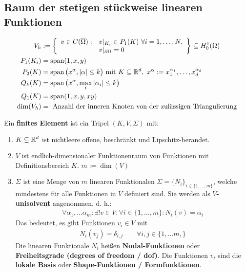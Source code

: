 \subsection*{Raum der stetigen stückweise linearen Funktionen}
\begin{align*}
	V_h&:=\left\lbrace
	\begin{array}{rl}
		v\in C(\overline{\Omega}) : &v|_{K_i}\in P_1(K)~\forall i=1,\ldots,N,\\
		&v|_{\partial\Omega}=0
	\end{array}\right\rbrace
	\subseteq H^1_0(\Omega)\\
	P_1(K_i)&=\operatorname{span}(1,x,y)\\
	P_2(K)&=\operatorname{span}\big( x^\alpha, |\alpha|\leq k\big)\text{ mit } K\subseteq\mathbb{R}^d,~ x^{\alpha}:=x_1^{\alpha_1},\ldots,x_d^{\alpha_d}\\
	Q_k(K)&=\operatorname{span}\big(x^\alpha,\max\limits_i |\alpha_i|\leq k\big)\\
	Q_1(K)&=\operatorname{span}(1,x,y,xy)\\
	\dim(V_h)&=\text{ Anzahl der inneren Knoten von der zulässigen Triangulierung}\\
\end{align*}

\begin{definition}\enter %
	Ein \textbf{finites Element} ist ein Tripel $(K,V,\Sigma)$ mit:
	\begin{enumerate}[label=(\roman*)]
		\item $K\subseteq\mathbb{R}^d$ ist nichtleere offene, beschränkt und Lipschitz-berandet.
		\item $V$ ist endlich-dimensionaler Funktionenraum von Funktionen mit Definitionsbereich $K$. $m:=\dim(V)$
		\item $\Sigma$ ist eine Menge von $m$ linearen Funktionalen $\Sigma=\lbrace N_i\rbrace_{i\in\lbrace1,\ldots,m\rbrace}$, welche mindestens für alle 	 Funktionen in $V$ definiert sind.
		Sie werden als \textbf{$V$-unisolvent} angenommen, d. h.:
		\begin{align*}
			\forall \alpha_1,\ldots\alpha_m:\exists! v\in V:\forall i\in\lbrace1,\ldots,m\rbrace:N_i(v)=\alpha_i
		\end{align*}
		Das bedeutet, es gibt Funktionen $v_i\in V$ mit
		\begin{align*}
			N_i(v_j)=\delta_{i,j}\qquad\forall i,j\in\lbrace1,\ldots m,\rbrace
		\end{align*}
		Die linearen Funktionale $N_i$ heißen \textbf{Nodal-Funktionen} oder \textbf{Freiheitsgrade (degrees of freedom / dof)}.
		Die Funktionen $v_i$ sind die \textbf{lokale Basis} oder \textbf{Shape-Funktionen / Formfunktionen}.
	\end{enumerate}
\end{definition}

